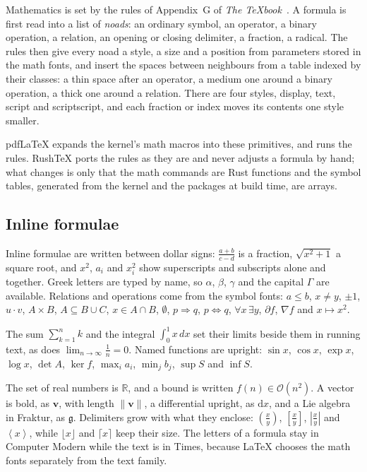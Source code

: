 \documentclass{article}
\numberwithin{equation}{section}
\theoremstyle{definition}
\theoremstyle{remark}
\begin{document}
Mathematics is set by the rules of Appendix~G of \textit{The \TeX book}~\cite{knuth86}.
A formula is first read into a list of \emph{noads}: an ordinary symbol, an operator, a
binary operation, a relation, an opening or closing delimiter, a fraction, a radical.
The rules then give every noad a style, a size and a position from parameters stored in
the math fonts, and insert the spaces between neighbours from a table indexed by their
classes: a thin space after an operator, a medium one around a binary operation, a
thick one around a relation. There are four styles, display, text, script and
scriptscript, and each fraction or index moves its contents one style smaller.

pdfLaTeX expands the kernel's math macros into these primitives, and runs the rules.
RushTeX ports the rules as they are and never adjusts a formula by hand; what changes is
only that the math commands are Rust functions and the symbol tables, generated from
the kernel and the packages at build time, are arrays.

\subsection{Inline formulae}

Inline formulae are written between dollar signs: $\frac{a+b}{c-d}$ is a fraction,
$\sqrt{x^2+1}$ a square root, and $x^{2}$, $a_{i}$ and $x_{i}^{2}$ show superscripts and
subscripts alone and together. Greek letters are typed by name, so $\alpha$, $\beta$,
$\gamma$ and the capital $\Gamma$ are available. Relations and operations come from
the symbol fonts: $a \leq b$, $x \neq y$, $\pm 1$, $u \cdot v$, $A \times B$, $A
\subseteq B \cup C$, $x \in A \cap B$, $\emptyset$, $p \Rightarrow q$, $p
\Leftrightarrow q$, $\forall x\, \exists y$, $\partial f$, $\nabla f$ and $x \mapsto
x^2$.

The sum $\sum_{k=1}^{n} k$ and the integral $\int_0^1 x\,dx$ set their limits beside
them in running text, as does $\lim_{n\to\infty} \frac{1}{n} = 0$. Named functions are
upright: $\sin x$, $\cos x$, $\exp x$, $\log x$, $\det A$, $\ker f$, $\max_i a_i$,
$\min_j b_j$, $\sup S$ and $\inf S$.

The set of real numbers is $\mathbb{R}$, and a bound is written $f(n) \in
\mathcal{O}(n^2)$. A vector is bold, as $\mathbf{v}$, with length $\|\mathbf{v}\|$, a
differential upright, as $\mathrm{d}x$, and a Lie algebra in Fraktur, as
$\mathfrak{g}$. Delimiters grow with what they enclose: $\left( \frac{x}{y} \right)$,
$\left[ \frac{x}{y} \right]$, $\left| \frac{x}{y} \right|$ and $\left\langle x
\right\rangle$, while $\lfloor x \rfloor$ and $\lceil x \rceil$ keep their size. The
letters of a formula stay in Computer Modern while the text is in Times, because
\LaTeX{} chooses the math fonts separately from the text family.
\end{document}
